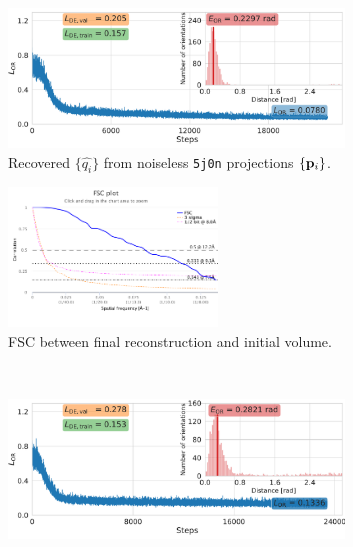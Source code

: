 \begin{figure}[t]
    \centering
    \begin{subfigure}[b]{0.56\linewidth}
        \centering
        \includegraphics[height=10em]{figures/5j0n_ar_aa_fullcvg}
        \caption{Recovered $\{ \widehat{q_i} \}$ from noiseless \texttt{5j0n} projections $\{ \mathbf{p}_i \}$.
        }%
        \label{fig:5j0n-noise0-orientation-recovery}
    \end{subfigure}
    \hfill
    \begin{subfigure}[b]{0.4\linewidth}
        \centering
        \includegraphics[height=10em]{figures/FSC_5j0n_fullcvg_noise0_fin_vs_init.pdf}
        \caption{FSC between final reconstruction and initial volume.}%
        \label{fig:5j0n-noise0-reconstruction-recovered}
    \end{subfigure}
    \\ \vspace{1em}
    \begin{subfigure}[b]{0.56\linewidth}
        \centering
        \includegraphics[height=10em]{figures/5j0n_fullcov_noise16_ar_aa}

\end{subfigure}
\end{figure}
